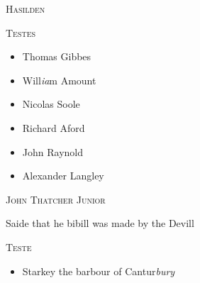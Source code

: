 \documentclass[12pt, a4paper]{book}
\begin{document}
 

	
				\begin{center} \begin{large} {\scshape Hasilden} \end{large} \end{center}
			
	
		\begin{center} {\scshape Testes} \end{center}\begin{itemize}
			
			\item[]Thomas Gibbes
			\item[]Will\textit{ia}m Amount
			\item[]Nicolas Soole
			\item[]Richard Aford
			\item[]John Raynold
			\item[]Alexander Langley
		\end{itemize}
	

            
            	
				\begin{center} \begin{large} {\scshape John Thatcher Junior } \end{large} \end{center}
			

	
		\ifthenelse{\isodd{\thepage}}
		{\reversemarginpar}
		{\normalmarginpar}
		Saide that he bibill was made by the
 Devill
 \begin{center} {\scshape Teste} \end{center}\begin{itemize}
 	
 	\item[]Starkey the barbour of Cantur\textit{bury}
 \end{itemize}
 
            
            
\dotfill
					  \subsection*{}  \subsection*{}  \section*{}
\end{document}
